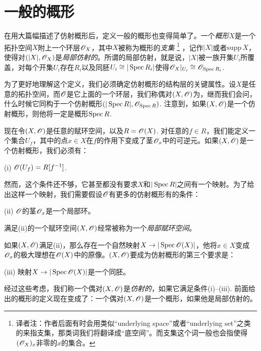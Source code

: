 \section{一般的概形} \label{s:1.2}

在用大篇幅描述了仿射概形后，定义一般的概形也变得简单了。一个\textit{概形}$X$是一个拓扑空间$X$附上一个环层$\mathscr{O}_X$，其中$X$被称为概形的\textit{支集}
\footnote{译者注：作者后面有时会用类似``underlying space''或者``underlying set''之类的来指支集，那类词我们将翻译成“底空间”。而支集这个词一般也会指使得$(\mathscr{O}_X)_x$非零的$x$的集合。}
，记作$|X|$或者$\mathrm{supp}\,X$，使得对$(|X|,\mathscr{O}_X)$是\textit{局部仿射的}。所谓的局部仿射，就是说，$|X|$被一族开集$U_i$所覆盖，对每个开集$U_i$存在$R_i$以及同胚$U_i\cong |\operatorname{Spec} R_i|$使得$\mathscr{O}_X|_{U_i}\cong \mathscr{O}_{\operatorname{Spec} R_i}$.

为了更好地理解这个定义，我们必须确定仿射概形的结构层的关键属性。设$X$是任意的拓扑空间，而$\mathscr{O}$是它上面的一个环层，我们称偶对$(X,\mathscr{O})$为，继而我们会问，什么时候它同构于一个仿射概形$(|\operatorname{Spec} R|,\mathscr{O}_{\operatorname{Spec} R})$. 注意到，如果$(X,\mathscr{O})$是一个仿射概形，则他将一定是概形$\operatorname{Spec} R$.

现在令$(X,\mathscr{O})$是任意的赋环空间，以及$R=\mathscr{O}(X)$. 对任意的$f\in R$，我们能定义一个集合$U_f$，其中的点$x\in X$在$f$的作用下变成了茎$\mathscr{O}_x$中的可逆元。如果$(X,\mathscr{O})$是一个仿射概形，我们必须有：
\begin{compactitem}
\item[(i)] $\mathscr{O}(U_f)=R[f^{-1}]$.
\end{compactitem}
然而，这个条件还不够，它甚至都没有要求$X$和$|\operatorname{Spec} R|$之间有一个映射。为了给出这样一个映射，我们需要假设$\mathscr{O}$有更多的仿射概形有的条件：
\begin{compactitem}
\item[(ii)] $\mathscr{O}$的茎$\mathscr{O}_x$是一个局部环。
\end{compactitem}
满足(ii)的一个赋环空间$(X,\mathscr{O})$经常被称为一个\textit{局部赋环空间}。

如果$(X,\mathscr{O})$满足(ii)，那么存在一个自然映射$X\to |\operatorname{Spec} \mathscr{O}(X)|$，他将$x\in X$变成$\mathscr{O}_x$的极大理想在$\mathscr{O}(X)$中的原像。$(X,\mathscr{O})$要成为仿射概形的第三个要求是：
\begin{compactitem}
\item[(iii)] 映射$X\to |\operatorname{Spec} \mathscr{O}(X)|$是一个同胚。
\end{compactitem}

经过这些考虑，我们称一个偶对$(X,\mathscr{O})$是\textit{仿射的}，如果它满足条件(i)--(iii). 前面给出的概形的定义现在变成了：一个偶对$(X,\mathscr{O})$是一个概形，如果他是局部仿射的。

